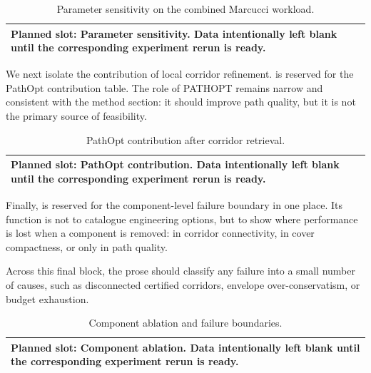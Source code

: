 \documentclass[journal]{IEEEtran}
\makeatletter
\DeclareRobustCommand{\textsc}[1]{\textnormal{\MakeUppercase{#1}}}
\newcommand{\plannedtable}[3]{%
\begin{table}[t]
  \centering
  \caption{#1}
  \label{#2}
  \small
  \begin{tabular}{@{}p{0.94\columnwidth}@{}}
    \toprule
    Planned slot: #3. Data intentionally left blank until the corresponding
    experiment rerun is ready. \\
    \bottomrule
  \end{tabular}
\end{table}
}
\makeatother
\begin{document}
\plannedtable{Parameter sensitivity on the combined Marcucci workload.}{tab:b4_sensitivity}{Parameter sensitivity}

We next isolate the contribution of local corridor refinement. 
is reserved for the PathOpt contribution table. The role of \textsc{PathOpt}
remains narrow and consistent with the method section: it should improve path
quality, but it is not the primary source of feasibility.

\plannedtable{PathOpt contribution after corridor retrieval.}{tab:pathopt}{PathOpt contribution}

Finally,  is reserved for the component-level failure
boundary in one place. Its function is not to catalogue engineering options,
but to show where performance is lost when a component is removed: in corridor
connectivity, in cover compactness, or only in path quality.

Across this final block, the prose should classify any failure into a small
number of causes, such as disconnected certified corridors, envelope
over-conservatism, or budget exhaustion.

\plannedtable{Component ablation and failure boundaries.}{tab:ablation}{Component ablation}
\end{document}
